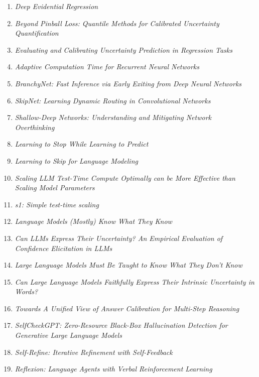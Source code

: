 \begin{enumerate}
\item \emph{Deep Evidential Regression}~\cite{amini2020deep}
\item \emph{Beyond Pinball Loss: Quantile Methods for Calibrated Uncertainty Quantification}~\cite{chung2021beyond}
\item \emph{Evaluating and Calibrating Uncertainty Prediction in Regression Tasks}~\cite{levi2022evaluating}
\item \emph{Adaptive Computation Time for Recurrent Neural Networks}~\cite{graves2016adaptive}
\item \emph{BranchyNet: Fast Inference via Early Exiting from Deep Neural Networks}~\cite{teerapittayanon2016branchynet}
\item \emph{SkipNet: Learning Dynamic Routing in Convolutional Networks}~\cite{wang2018skipnet}
\item \emph{Shallow-Deep Networks: Understanding and Mitigating Network Overthinking}~\cite{kaya2019shallowdeep}
\item \emph{Learning to Stop While Learning to Predict}~\cite{chen2020learningtostop}
\item \emph{Learning to Skip for Language Modeling}~\cite{zeng2023learningtoskip}
\item \emph{Scaling LLM Test-Time Compute Optimally can be More Effective than Scaling Model Parameters}~\cite{snell2025scaling}
\item \emph{s1: Simple test-time scaling}~\cite{muennighoff2025s1}
\item \emph{Language Models (Mostly) Know What They Know}~\cite{kadavath2022language}
\item \emph{Can LLMs Express Their Uncertainty? An Empirical Evaluation of Confidence Elicitation in LLMs}~\cite{xiong2024can}
\item \emph{Large Language Models Must Be Taught to Know What They Don't Know}~\cite{kapoor2024large}
\item \emph{Can Large Language Models Faithfully Express Their Intrinsic Uncertainty in Words?}~\cite{yona2024can}
\item \emph{Towards A Unified View of Answer Calibration for Multi-Step Reasoning}~\cite{deng2024towards}
\item \emph{SelfCheckGPT: Zero-Resource Black-Box Hallucination Detection for Generative Large Language Models}~\cite{manakul2023selfcheckgpt}
\item \emph{Self-Refine: Iterative Refinement with Self-Feedback}~\cite{madaan2023selfrefine}
\item \emph{Reflexion: Language Agents with Verbal Reinforcement Learning}~\cite{shinn2023reflexion}

\end{enumerate}
